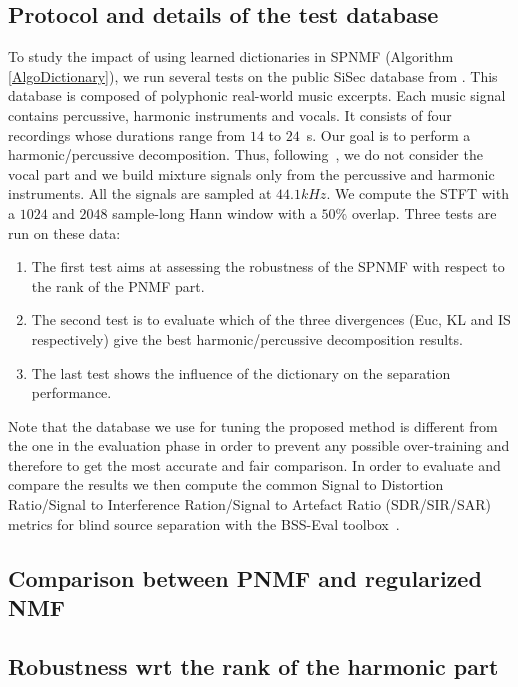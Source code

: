 \subsection{Protocol and details of the test database}


To study the impact of using learned dictionaries in SPNMF (Algorithm \ref{AlgoDictionary}), we run several tests on the public SiSec database from \cite{SiSec10}. This database is composed of polyphonic real-world music excerpts. Each music signal contains percussive, harmonic instruments and vocals. It consists of four recordings whose durations range from $14$ to $24$~s. Our goal is to perform a harmonic/percussive decomposition. Thus, following~\cite{canadas2014percussive}, we do not consider the vocal part and we build mixture signals only from the percussive and harmonic instruments. All the signals are sampled at $44.1kHz$. We compute the STFT with a $1024$ and $2048$ sample-long Hann window with a $50\%$ overlap.
Three tests are run on these data:
\begin{enumerate}
	\item The first test aims at assessing the robustness of the SPNMF with respect to the rank of the PNMF part. 
	\item The second test is to evaluate which of the three divergences (Euc, KL and IS respectively) give the best harmonic/percussive decomposition results.
	\item The last test shows the influence of the dictionary on the separation performance. 
\end{enumerate} 
Note that the database we use for tuning the proposed method is different from the one in the evaluation phase in order to prevent any possible over-training and therefore to get the most accurate and fair comparison. 
In order to evaluate and compare the results we then compute the common Signal to Distortion Ratio/Signal to Interference Ration/Signal to Artefact Ratio (SDR/SIR/SAR) metrics for blind source separation with the BSS-Eval toolbox~\cite{bsseval}. 



\subsection{Comparison between PNMF and regularized NMF}




\subsection{Robustness wrt the rank of the harmonic part}
\label{setup:rank}

